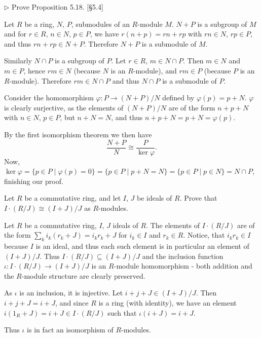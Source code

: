 \begin{problem}
	$\triangleright$ Prove Proposition 5.18. [\S 5.4]
\end{problem}

\begin{solution}
	Let $R$ be a ring, $N$, $P$, submodules of an $R$-module $M$. $N + P$ is a subgroup of $M$ and for $r \in R$, $n \in N$, $p \in P$, we have $r(n + p) = rn + rp$ with $rn \in N$, $rp \in P$, and thus $rn + rp \in N + P$. Therefore $N + P$ is a submodule of $M$.
	
	Similarly $N \cap P$ is a subgroup of $P$. Let $r \in R$, $m \in N \cap P$. Then $m \in N$ and $m \in P$, hence $rm \in N$ (because $N$ is an $R$-module), and $rm \in P$ (because $P$ is an $R$-module). Therefore $rm \in N \cap P$ and thus $N \cap P$ is a submodule of $P$.
	
	Consider the homomorphism $\varphi: P \to (N + P)/N$ defined by $\varphi(p) = p + N$. $\varphi$ is clearly surjective, as the elements of $(N + P)/N$ are of the form $n + p + N$ with $n \in N$, $p \in P$, but $n + N = N$, and thus $n + p + N = p + N = \varphi(p)$.
	
	By the first isomorphism theorem we then have
	\[
		\frac{N + P}{N} \cong \frac{P}{\ker \varphi} \text{.}
	\]
	Now, $\ker \varphi = \{ p \in P \mid \varphi(p) = 0 \} = \{ p \in P \mid p + N = N \} = \{ p \in P \mid p \in N \} = N \cap P$, finishing our proof.
\end{solution}

\begin{problem}
	Let $R$ be a commutative ring, and let $I$, $J$ be ideals of $R$. Prove that $I \cdot (R/J) \cong (I + J)/J$ as $R$-modules.
\end{problem}

\begin{solution}
	Let $R$ be a commutative ring, $I$, $J$ ideals of $R$. The elements of $I \cdot (R/J)$ are of the form $\sum_k i_k (r_k + J) = i_k r_k + J$ for $i_k \in I$ and $r_k \in R$. Notice, that $i_k r_k \in I$ because $I$ is an ideal, and thus each such element is in particular an element of $(I + J)/J$. Thus $I \cdot (R/J) \subseteq (I + J)/J$ and the inclusion function $\iota: I \cdot (R/J) \to (I + J)/J$ is an $R$-module homomorphism - both addition and the $R$-module structure are clearly preserved.
	
	As $\iota$ is an inclusion, it is injective. Let $i + j + J \in (I + J)/J$. Then $i + j + J = i + J$, and since $R$ is a ring (with identity), we have an element $i (1_R + J) = i + J \in I \cdot (R/J)$ such that $\iota(i + J) = i + J$.
	
	Thus $\iota$ is in fact an isomorphism of $R$-modules.
\end{solution}

